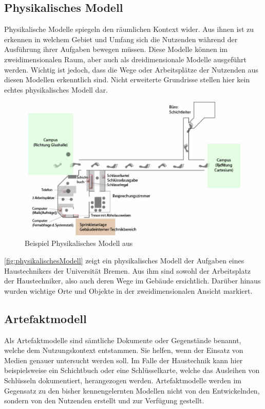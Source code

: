 \subsection{Physikalisches Modell}

Physikalische Modelle spiegeln den räumlichen Kontext wider.
Aus ihnen ist zu erkennen in welchem Gebiet und Umfang sich die Nutzenden während der Ausführung ihrer Aufgaben bewegen müssen.
Diese Modelle können im zweidimensionalen Raum, aber auch als dreidimensionale Modelle ausgeführt werden.
Wichtig ist jedoch, dass die Wege oder Arbeitsplätze der Nutzenden aus diesen Modellen erkenntlich sind.
Nicht erweiterte Grundrisse stellen hier kein echtes physikalisches Modell dar.

\begin{figure}[htp]
    \centering
    \includegraphics[width=.75\textwidth]{images/3-Modelle/physikalischesmodell.png}
    \caption{Beispiel Physikalisches Modell aus \cite{NOG}}
    \label{fig:physikalischesModell}
\end{figure}

\autoref{fig:physikalischesModell} zeigt ein physikalisches Modell der Aufgaben eines Haustechnikers der Universität Bremen.
Aus ihm sind sowohl der Arbeitsplatz der Haustechniker, also auch deren Wege im Gebäude ersichtlich.
Darüber hinaus wurden wichtige Orte und Objekte in der zweidimensionalen Ansicht markiert.

\subsection{Artefaktmodell}

Als Artefaktmodelle sind sämtliche Dokumente oder Gegenstände benannt, welche dem Nutzungskontext entstammen.
Sie helfen, wenn der Einsatz von Medien genauer untersucht werden soll.
Im Falle der Haustechnik kann hier beispielsweise ein Schichtbuch oder eine Schlüsselkarte, welche das Ausleihen von Schlüsseln dokumentiert, herangezogen werden.
Artefaktmodelle werden im Gegensatz zu den bisher kennengelernten Modellen nicht von den Entwickelnden, sondern von den Nutzenden erstellt und zur Verfügung gestellt.

